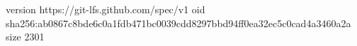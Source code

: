 version https://git-lfs.github.com/spec/v1
oid sha256:ab0867c8bde6c0a1fdb471bc0039cdd8297bbd94ff0ea32ec5c0cad4a3460a2a
size 2301
